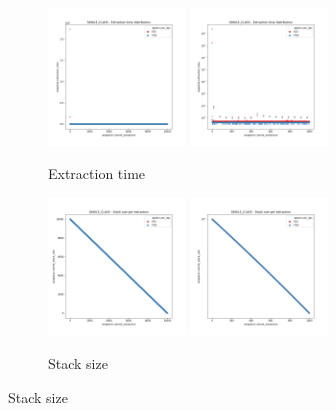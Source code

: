 \begin{figure}
    \begin{subfigure}[b]{\textwidth}
        \centering
        \includegraphics[width=0.40\textwidth]{./fragments/04_experimental_execution/images/01_basebenchmark_04_single_class.png.1_0.png}
        \includegraphics[width=0.40\textwidth]{./fragments/04_experimental_execution/images/01_basebenchmark_04_single_class.png.1_1.png}
        \caption{Extraction time}
        \label{FIG:BENCHMARK_04_SINGLE_CLASS__0_0}
    \end{subfigure}

    \begin{subfigure}[b]{\textwidth}
        \centering
        \includegraphics[width=0.40\textwidth]{./fragments/04_experimental_execution/images/01_basebenchmark_04_single_class.png.2_0.png}
        \includegraphics[width=0.40\textwidth]{./fragments/04_experimental_execution/images/01_basebenchmark_04_single_class.png.2_1.png}
        \caption{Stack size}
        \label{FIG:BENCHMARK_04_SINGLE_CLASS__0_0}
    \end{subfigure}
    

\end{figure}
